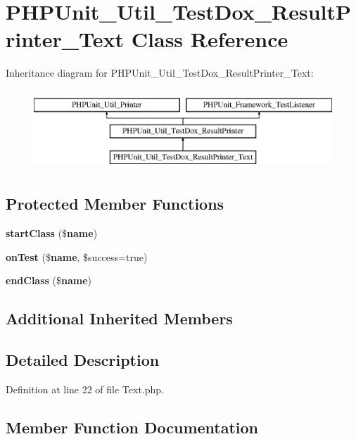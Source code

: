 \section{P\+H\+P\+Unit\+\_\+\+Util\+\_\+\+Test\+Dox\+\_\+\+Result\+Printer\+\_\+\+Text Class Reference}
\label{class_p_h_p_unit___util___test_dox___result_printer___text}
Inheritance diagram for P\+H\+P\+Unit\+\_\+\+Util\+\_\+\+Test\+Dox\+\_\+\+Result\+Printer\+\_\+\+Text\+:\begin{figure}[H]
\begin{center}
\leavevmode
\includegraphics[height=3.000000cm]{class_p_h_p_unit___util___test_dox___result_printer___text}
\end{center}
\end{figure}
\subsection*{Protected Member Functions}
\begin{DoxyCompactItemize}
\item 
{\bf start\+Class} (\${\bf name})
\item 
{\bf on\+Test} (\${\bf name}, \$success=true)
\item 
{\bf end\+Class} (\${\bf name})
\end{DoxyCompactItemize}
\subsection*{Additional Inherited Members}


\subsection{Detailed Description}


Definition at line 22 of file Text.\+php.



\subsection{Member Function Documentation}
